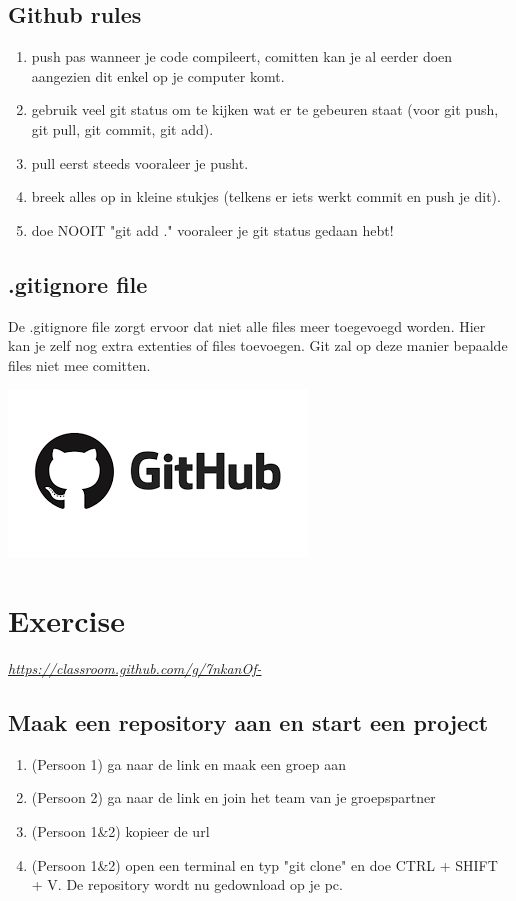 \documentclass[a4paper, titlepage]{article}
\begin{document}
		\subsection{Github rules}
		\begin{enumerate}
			\item push pas wanneer je code compileert, comitten kan je al eerder doen aangezien dit enkel op je computer komt.
			\item gebruik veel git status om te kijken wat er te gebeuren staat (voor git push, git pull, git commit, git add).
			\item pull eerst steeds vooraleer je pusht.			
			\item breek alles op in kleine stukjes (telkens er iets werkt commit en push je dit).
			\item doe NOOIT "git add ." vooraleer je git status gedaan hebt!
		\end{enumerate}
		
		\subsection{.gitignore file}
			De .gitignore file zorgt ervoor dat niet alle files meer toegevoegd worden. Hier kan je zelf nog extra extenties of files toevoegen. Git zal op deze manier bepaalde files niet mee comitten.
		\pagebreak
	
	\includegraphics[scale=0.4]{img/github.png}
	\section{Exercise}
	\href{https://classroom.github.com/g/7nkanOf-}{\textit{https://classroom.github.com/g/7nkanOf-}}
		\subsection{Maak een repository aan en start een project}
			\begin{enumerate}
				\item (Persoon 1) ga naar de link en maak een groep aan
				\item (Persoon 2) ga naar de link en join het team van je groepspartner
				\item (Persoon 1\&2) kopieer de url
				\item (Persoon 1\&2) open een terminal en typ "git clone" en doe CTRL + SHIFT + V. De repository wordt nu gedownload op je pc.
			\end{enumerate}
\end{document}
